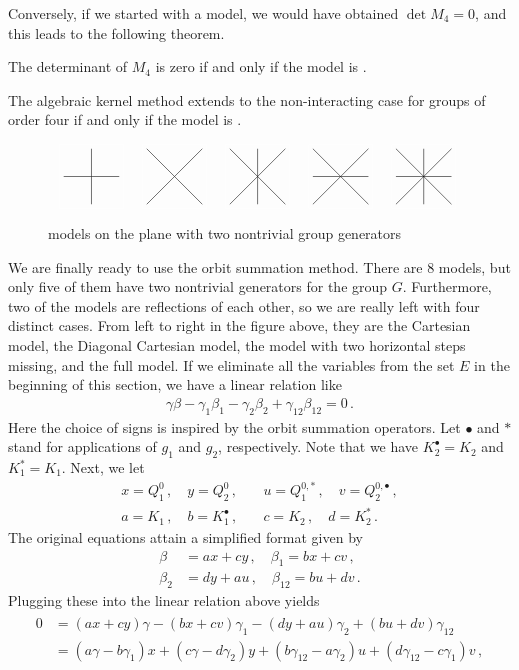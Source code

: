 Conversely, if we started with a \highSym model, we would have obtained $\det M_4 = 0$, and this leads to the following theorem.
\begin{prop} The determinant of $M_4$ is zero if and only if the model is \highSym.
\end{prop}

\begin{cor} The algebraic kernel method extends to the non-interacting case for groups of order four if and only if the model is \highSym.
\end{cor}
\begin{figure}[H]
	\centering
	\[
		\modelgraphB 01011010 \quad \modelgraphB10100101  \quad \modelgraphB 11100111  \quad \modelgraphB 10111101  \quad \modelgraphB 11111111 
	\]
	\caption{\HighSym models on the plane with two nontrivial group generators}
\end{figure}
We are finally ready to use the orbit summation method. There are 8 \highSym \twoD models, but only five of them have two nontrivial generators for the group $G$. Furthermore, two of the models are reflections of each other, so we are really left with four distinct cases. From left to right in the figure above, they are the Cartesian model, the Diagonal Cartesian model, the model with two horizontal steps missing, and the full model. If we eliminate all the variables from the set $E$ in the beginning of this section, we have a linear relation like
\begin{align}
	\gamma \beta- \gamma_1 \beta_1-\gamma_2 \beta_2 + \gamma_{12}\beta_{12} = 0\,.
\end{align}
Here the choice of signs is inspired by the orbit summation operators. Let $\bullet$ and $\ast$ stand for applications of $g_1$ and $g_2$, respectively. Note that we have $K_2^\bullet = K_2$ and $K_1^\ast = K_1$. Next, we let
\begin{align}
	x = Q_1^0\,,\quad y= Q_2^0\,,& \quad u= Q_1^{0,\ast}\,,\quad v = Q_2^{0,\bullet}\,,\\
	a = K_1\,,\quad b = K_1^\bullet\,,&\quad c=K_2 \,, \quad d = K_2^\ast\,.
\end{align}
The original equations attain a simplified format given by
\begin{align}
	\beta &= a x + c y\,,\quad \beta_1 = b x + c v\,,\\
	\beta_2 &= d y + a u\,,\quad \beta_{12} = b u + d v\,.
\end{align}
Plugging these into the linear relation above yields
\begin{align}
	\begin{split}
		0 &= (ax + cy)\gamma - (bx + cv)\gamma_1 - (dy + au)\gamma_2 + (bu + dv) \gamma_{12}\\
		   &= (a\gamma-b\gamma_1)x + (c\gamma-d\gamma_2)y + (b\gamma_{12}-a\gamma_2)u + (d\gamma_{12}-c\gamma_1)v\,,
	\end{split}
\end{align}
